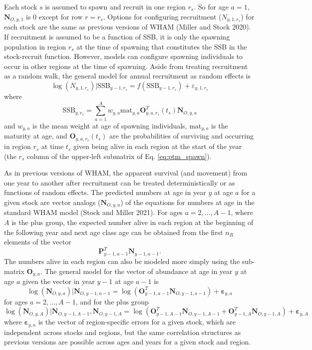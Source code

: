 \documentclass[
]{article}
\begin{document}
Each stock \(s\) is assumed to spawn and recruit in one region \(r_s\). So for age \(a=1\), \(\mathbf{N}_{O,y,1}\) is 0 except for row \(r = r_s\). Options for configuring recruitment (\(N_{y,1,r_s}\)) for each stock are the same as previous versions of WHAM (Miller and Stock 2020). If recruitment is assumed to be a function of SSB, it is only the spawning population in region \(r_s\) at the time of spawning that constitutes the SSB in the stock-recruit function. However, models can configure spawning individuals to occur in other regions at the time of spawning. Aside from treating recruitment as a random walk, the general model for annual recruitment as random effects is
\begin{equation*}
\log\left(N_{y,1,r_s}\right)|\text{SSB}_{y-1,r_s} =  f\left(\text{SSB}_{y-1,r_s}\right) + \varepsilon_{y,1,r_s}
\end{equation*}
where\\
\[\text{SSB}_{y,r_s} =  \sum^A_{a=1}  w_{y,a} \text{mat}_{y,a} \mathbf{O}_{y,a,r_s}^T(t_s) \mathbf{N}_{O,y,a}\]
and \(w_{y,a}\) is the mean weight at age of spawning individuals, \(\text{mat}_{y,a}\) is the maturity at age, and \(\mathbf{O}_{y,a,r_s}(t_s)\) are the probabilities of surviving and occurring in region \(r_s\) at time \(t_s\) given being alive in each region at the start of the year (the \(r_s\) column of the upper-left submatrix of Eq. \ref{eq:ptm_spawn}).

As in previous versions of WHAM, the apparent survival (and movement) from one year to another after recruitment can be treated deterministically or as functions of random effects. The predicted numbers at age in year \(y\) at age \(a\) for a given stock are vector analogs (\(\mathbf{N}_{O,y,a}\)) of the equations for numbers at age in the standard WHAM model (Stock and Miller 2021). For ages \(a = 2,\ldots, A-1\), where \(A\) is the plus group, the expected number alive in each region at the beginning of the following year and next age class age can be obtained from the first \(n_R\) elements of the vector
\[\mathbf{P}_{y-1,a-1}^T \mathbf{N}_{y-1,a-1}.\]
The numbers alive in each region can also be modeled more simply using the sub-matrix \(\mathbf{O}_{y,a}\). The general model for the vector of abundance at age in year \(y\) at age \(a\) given the vector in year \(y-1\) at age \(a-1\) is
\begin{equation*}
\log\left(\mathbf{N}_{O,y,a}\right)|\mathbf{N}_{O,y-1,a-1} =  \log\left(\mathbf{O}_{y-1,a-1}^T \mathbf{N}_{O,y-1,a-1}\right) + \boldsymbol{\varepsilon}_{y,a}
\end{equation*}
for ages \(a = 2,\ldots, A-1\), and for the plus group
\begin{equation*}
\log\left(\mathbf{N}_{O,y,A}\right)|\mathbf{N}_{O,y-1,A-1},\mathbf{N}_{O,y-1,A} = \log\left(\mathbf{O}_{y-1,A-1}^T \mathbf{N}_{O,y-1,A-1} + \mathbf{O}_{y-1,A}^T \mathbf{N}_{O,y-1,A}\right) + \boldsymbol{\varepsilon}_{y,A}
\end{equation*}
where \(\boldsymbol{\varepsilon}_{y,a}\) is the vector of region-specific errors for a given stock, which are independent across stocks and regions, but the same correlation structures as previous versions are possible across ages and years for a given stock and region.
\end{document}

